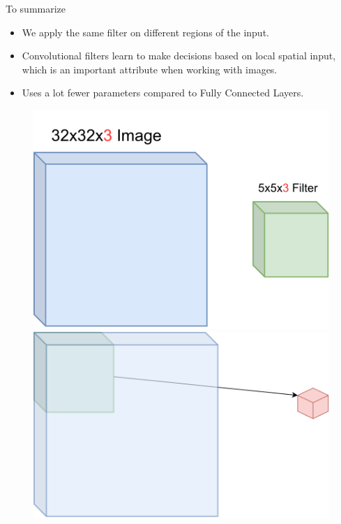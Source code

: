 \documentclass[default, aspectratio=169]{beamer}
\begin{document}
	\begin{frame}{To summarize}
			\normalsize
				\begin{itemize}
				\item We apply the same filter on different regions of the input.
				\item Convolutional filters learn to make decisions based on local spatial input, which is an important attribute when working with images.
				\item Uses a lot fewer parameters compared to Fully Connected Layers.
			\end{itemize}
			\begin{figure}
				    \includegraphics[keepaspectratio, scale=0.25]{pic/CNN2.png}
				\hspace{3cm}  %
				\includegraphics[keepaspectratio, scale=0.25]{pic/kernel2.png}
			\end{figure}
	\end{frame}
	
\end{document}
